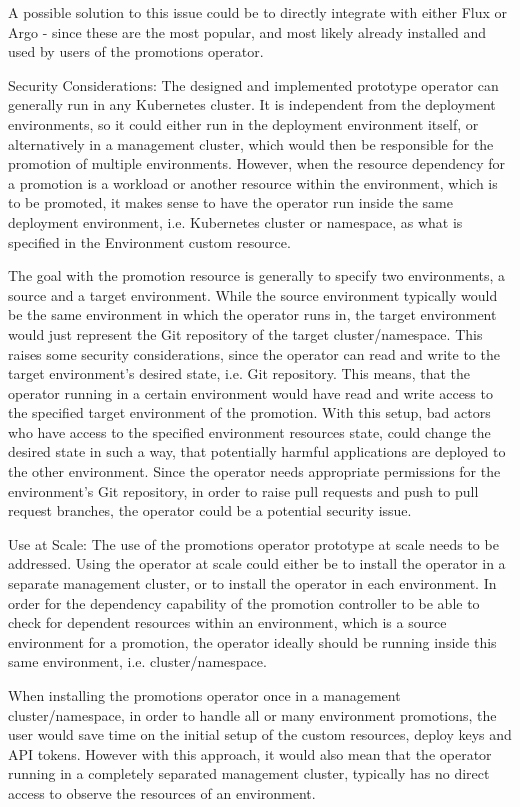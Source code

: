 A possible solution to this issue could be to directly integrate with either Flux or Argo - since these are the most popular, and most likely already installed and used by users of the promotions operator.

Security Considerations:
The designed and implemented prototype operator can generally run in any Kubernetes cluster.
It is independent from the deployment environments, so it could either run in the deployment environment itself,
or alternatively in a management cluster, which would then be responsible for the promotion of multiple environments.
However, when the resource dependency for a promotion is a workload or another resource within the environment,
which is to be promoted, it makes sense to have the operator run inside the same deployment environment, i.e. Kubernetes cluster or namespace, as what is specified in the Environment custom resource.

The goal with the promotion resource is generally to specify two environments,
a source and a target environment.
While the source environment typically would be the same environment in which the operator runs in,
the target environment would just represent the Git repository of the target cluster/namespace.
This raises some security considerations,
since the operator can read and write to the target environment's desired state, i.e. Git repository.
This means, that the operator running in a certain environment would have read and write access
to the specified target environment of the promotion.
With this setup, bad actors who have access to the specified environment resources state,
could change the desired state in such a way, that
potentially harmful applications are deployed to the other environment.
Since the operator needs appropriate permissions for the environment's Git repository,
in order to raise pull requests and push to pull request branches, the operator could
be a potential security issue.

Use at Scale:
The use of the promotions operator prototype at scale needs to be addressed.
Using the operator at scale could either be to install the operator in a separate management cluster,
or to install the operator in each environment.
In order for the dependency capability of the promotion controller
to be able to check for dependent resources within an environment,
which is a source environment for a promotion,
the operator ideally should be running inside this same environment, i.e. cluster/namespace.

When installing the promotions operator once in a management cluster/namespace,
in order to handle all or many environment promotions,
the user would save time on the initial setup of the custom resources, deploy keys and API tokens.
However with this approach, it would also mean that the operator running in a completely separated management cluster, typically has no direct access to observe the resources of an environment.

